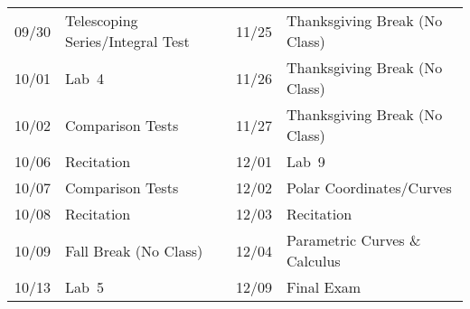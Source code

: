 \documentclass[11pt,letterpaper]{article}
\begin{document}
\begin{table}[!ht]
{\begin{tabular}{ll || ll}
	09/30 & Telescoping Series/Integral Test & 11/25 & Thanksgiving Break (No Class) \\
	10/01 & Lab~4 & 11/26 & Thanksgiving Break (No Class) \\
	10/02 & Comparison Tests & 11/27 & Thanksgiving Break (No Class) \\ 
	10/06 & Recitation & 12/01 & Lab~9 \\
	10/07 & Comparison Tests & 12/02 & Polar Coordinates/Curves \\
	10/08 & Recitation & 12/03 & Recitation \\
	10/09 & Fall Break (No Class) & 12/04 & Parametric Curves \& Calculus \\
	10/13 & Lab~5& 12/09 & Final Exam 
        \end{tabular}
        }
        \end{table}
\end{document}
